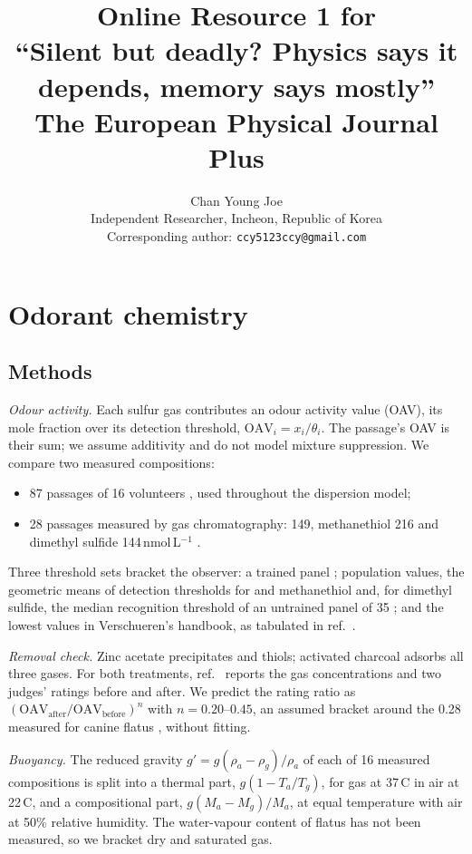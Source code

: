 \documentclass[11pt]{article}
\title{Online Resource 1 for\\ ``Silent but deadly? Physics says it depends, memory says mostly''\\[4pt]
  \large The European Physical Journal Plus}
\author{Chan Young Joe\\[2pt] \small Independent Researcher, Incheon, Republic of Korea\\
  \small Corresponding author: \texttt{ccy5123ccy@gmail.com}}
\date{}
\begin{document}
\maketitle

\setcounter{tocdepth}{1}  %
{\makeatletter\patchcmd{\l@section}{1.5em}{2.4em}{}{}\makeatother  %
\tableofcontents}

\section{Odorant chemistry}
\label{sec:si-chem}
\subsection{Methods}
\emph{Odour activity.} Each sulfur gas contributes an odour activity value (OAV), its mole fraction over its detection
threshold, $\mathrm{OAV}_i = x_i/\theta_i$. The passage's OAV is their sum; we assume additivity and do not model
mixture suppression. We compare two measured compositions:
\begin{itemize}
  \item 87 passages of 16 volunteers \cite{suarez1998}, used throughout the dispersion model;
  \item 28 passages measured by gas chromatography:  149, methanethiol 216 and dimethyl sulfide
  144\,nmol\,L$^{-1}$ \cite{tangerman2009}.
\end{itemize}
Three threshold sets bracket the observer: a trained panel \cite{nagata2003}; population values, the geometric
means of detection thresholds for  and methanethiol \cite{amoore1983} and, for dimethyl sulfide, the median
recognition threshold of an untrained panel of 35 \cite{wilby1969}; and the lowest values in Verschueren's handbook,
as tabulated in ref.~.

\emph{Removal check.} Zinc acetate precipitates  and thiols; activated charcoal adsorbs all three gases. For both
treatments, ref.~ reports the gas concentrations and two judges' ratings before and after. We
predict the rating ratio as $(\mathrm{OAV}_\mathrm{after}/\mathrm{OAV}_\mathrm{before})^n$ with $n = 0.20$--$0.45$,
an assumed bracket around the 0.28 measured for canine flatus \cite{collins2001}, without fitting.

\emph{Buoyancy.} The reduced gravity $g' = g(\rho_a-\rho_g)/\rho_a$ of each of 16 measured compositions
\cite{suarez1997} is split into a thermal part, $g(1-T_a/T_g)$, for gas at 37\,\textdegree C in air at
22\,\textdegree C, and a compositional part, $g(M_a-M_g)/M_a$, at equal temperature with air at 50\% relative
humidity. The water-vapour content of flatus has not been measured, so we bracket dry and saturated gas.
\end{document}
